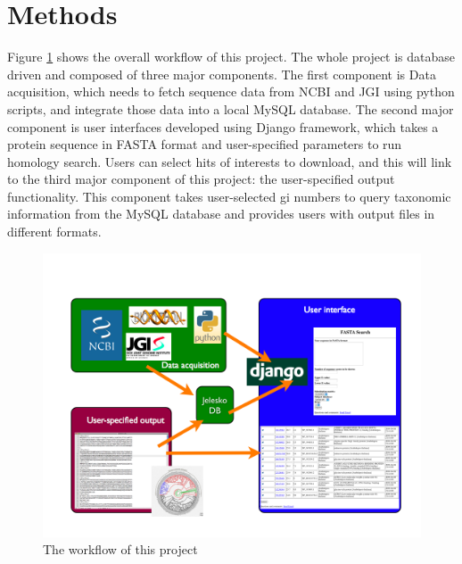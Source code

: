\documentclass[11pt,letterpaper,twoside,english]{article}
\begin{document}
\section{Methods}

Figure \ref{fig:The-workflow-of} shows the overall workflow of this
project. The whole project is database driven and composed of three
major components. The first component is Data acquisition, which needs
to fetch sequence data from NCBI and JGI using python scripts, and
integrate those data into a local MySQL database. The second major
component is user interfaces developed using Django framework, which
takes a protein sequence in FASTA format and user-specified parameters
to run homology search. Users can select hits of interests to download,
and this will link to the third major component of this project: the
user-specified output functionality. This component takes user-selected
gi numbers to query taxonomic information from the MySQL database
and provides users with output files in different formats.



%
\begin{figure}[h]
\begin{centering}
\includegraphics[width=1\linewidth]{figures/work_flow}
\par\end{centering}

\caption{\label{fig:The-workflow-of}The workflow of this project}

\end{figure}
\end{document}
